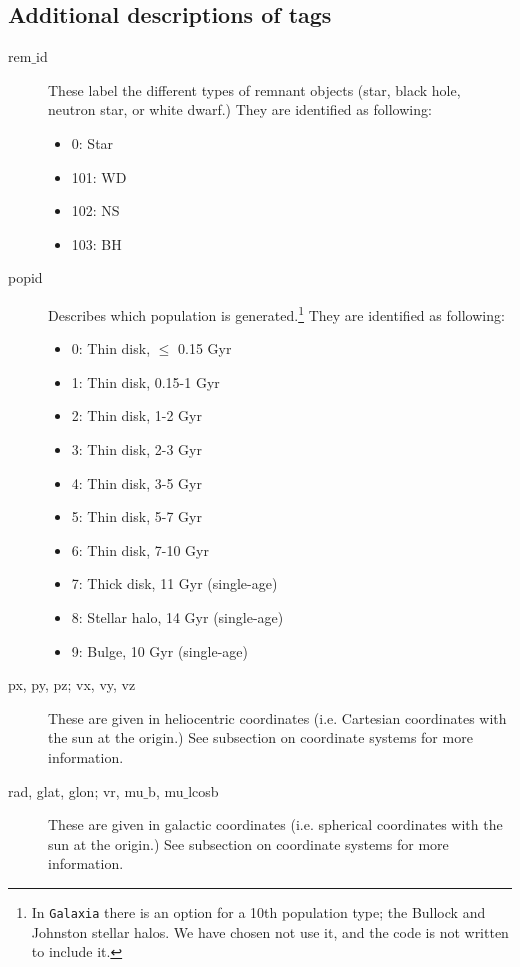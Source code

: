 \documentclass{scrartcl}
\begin{document}
\newpage

\newpage

\subsection{Additional descriptions of tags}
\begin{description}
    \item [rem$\_$id] These label the different types of remnant objects (star, black hole, neutron star, or white dwarf.) They are identified as following:
    \begin{itemize}
        \item 0: Star
        \item 101: WD 
        \item 102: NS
        \item 103: BH
    \end{itemize}
    
    \item [popid] Describes which population is generated.\footnote{In \texttt{Galaxia} there is an option for a 10th population type; the Bullock and Johnston stellar halos. We have chosen not use it, and the code is not written to include it.} They are identified as following:
    \begin{itemize}
        \item 0: Thin disk, $\leq$ 0.15 Gyr
        \item 1: Thin disk, 0.15-1 Gyr
        \item 2: Thin disk, 1-2 Gyr
        \item 3: Thin disk, 2-3 Gyr
        \item 4: Thin disk, 3-5 Gyr
        \item 5: Thin disk, 5-7 Gyr
        \item 6: Thin disk, 7-10 Gyr
        \item 7: Thick disk, 11 Gyr (single-age)
        \item 8: Stellar halo, 14 Gyr (single-age)
        \item 9: Bulge, 10 Gyr (single-age)
    \end{itemize}
    
    \item [px, py, pz; vx, vy, vz] These are given in heliocentric coordinates (i.e. Cartesian coordinates with the sun at the origin.) See subsection on coordinate systems for more information.
    
    \item [rad, glat, glon; vr, mu$\_$b, mu$\_$lcosb] These are given in galactic coordinates (i.e. spherical coordinates with the sun at the origin.) See subsection on coordinate systems for more information.
    

\end{description}
\end{document}
